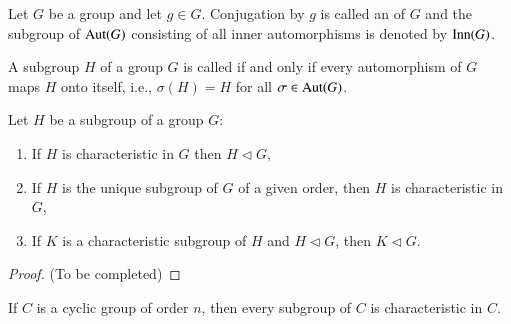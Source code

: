 \documentclass[12pt, a4paper, oneside, openright, titlepage]{book}
\begin{document}
\begin{defn}
    Let $G$ be a group and let $g \in G$. Conjugation by $g$ is called an  of $G$ and the subgroup of $\operatorname{Aut}(G)$ consisting of all inner automorphisms is denoted by $\operatorname{Inn}(G)$.
\end{defn}


\begin{defn}
    A subgroup $H$ of a group $G$ is called  if and only if every automorphism of $G$ maps $H$ onto itself, i.e., $\sigma(H) = H$ for all $\sigma \in \operatorname{Aut}(G)$.
\end{defn}


\begin{prop}
    Let $H$ be a subgroup of a group $G$: \begin{enumerate}
        \item If $H$ is characteristic in $G$ then $H \vartriangleleft G$,
        \item If $H$ is the unique subgroup of $G$ of a given order, then $H$ is characteristic in $G$,
        \item If $K$ is a characteristic subgroup of $H$ and $H \vartriangleleft G$, then $K\vartriangleleft G$.
    \end{enumerate}
\end{prop}
\begin{proof}
    (To be completed)
\end{proof}


\begin{cor}
    If $C$ is a cyclic group of order $n$, then every subgroup of $C$ is characteristic in $C$.
\end{cor}
\end{document}
